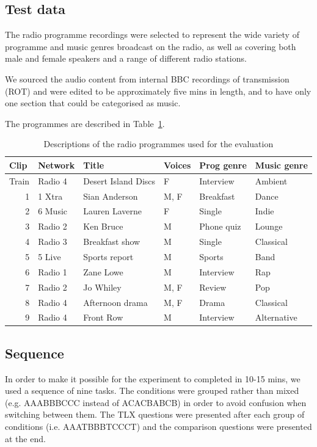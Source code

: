 \subsection{Test data}
The radio programme recordings were selected to represent the wide variety of programme and music genres broadcast on
the radio, as well as covering both male and female speakers and a range of different radio stations.

We sourced the audio content from internal BBC recordings of transmission (ROT) and were edited to be approximately
five mins in length, and to have only one section that could be categorised as music.

The programmes are described in Table~\ref{tab:clips}.

\begin{table}[htbp]
  \begin{center}
    {\small
    \begin{tabular}{|r|l|l|l|l|l|}
      \hline
      \multicolumn{1}{|l|}{\textbf{Clip}} & \textbf{Network} & \textbf{Title} &
      \textbf{Voices} & \textbf{Prog genre} & \textbf{Music genre} \\ \hline
      Train & Radio 4 & Desert Island Discs & F & Interview & Ambient \\ \hline
      1 & 1 Xtra & Sian Anderson & M, F & Breakfast & Dance \\ \hline
      2 & 6 Music & Lauren Laverne & F & Single & Indie \\ \hline
      3 & Radio 2 & Ken Bruce & M & Phone quiz & Lounge \\ \hline
      4 & Radio 3 & Breakfast show & M & Single & Classical \\ \hline
      5 & 5 Live & Sports report & M & Sports & Band \\ \hline
      6 & Radio 1 & Zane Lowe & M & Interview & Rap \\ \hline
      7 & Radio 2 & Jo Whiley & M, F & Review & Pop \\ \hline
      8 & Radio 4 & Afternoon drama & M, F & Drama & Classical \\ \hline
      9 & Radio 4 & Front Row & M & Interview & Alternative \\ \hline
    \end{tabular}
    }
  \end{center}
  \caption{Descriptions of the radio programmes used for the evaluation}
  \label{tab:clips}
\end{table}

\subsection{Sequence}\label{sec:studysequence}
In order to make it possible for the experiment to completed in 10-15 mins, we used a sequence of nine tasks. The
conditions were grouped rather than mixed (e.g. AAABBBCCC instead of ACACBABCB) in order to avoid confusion when
switching between them. The TLX questions were presented after each group of conditions (i.e. AAATBBBTCCCT) and the
comparison questions were presented at the end.

